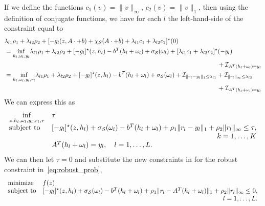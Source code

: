 If we define the functions $c_1(v) = \|v\|_\infty$, $c_2(v) = \|v\|_1$, then using the definition of conjugate functions, we have for each $l$ the left-hand-side of the constraint equal to
\begin{equation*}
\begin{aligned}
		& \lambda_{l1}\rho_1 +  \lambda_{l2}\rho_2 +  [-g_l(z,A\cdot+b) +\chi_\supp(A\cdot+b) + \lambda_{l1} c_1 + \lambda_{l2} c_2]^\star(0)\\
		&= 	\underset{h_l,\omega_l, y_l}{\inf} \lambda_{l1}\rho_1 + \lambda_{l2}\rho_2 + [-g_l]^\star(z,h_l) - b^T(h_l + \omega_l) + \sigma_\supp(\omega_l)  +  [\lambda_{l1} c_1 + \lambda_{l2} c_2 ]^\star(-y_l) \\
  &\hspace{12cm}+ \indicator_{A^T(h_l + \omega_l) = y_l} \\
		&= \underset{h_l,\omega_l, y_l, r_l}{\inf} \lambda_{l1}\rho_1 + \lambda_{l2}\rho_2 + [-g_l]^\star(z,h_l) - b^T(h_l + \omega_l)+ \sigma_\supp(\omega_l)  + \indicator_{\|r_l-y_l\|_1 \leq \lambda_{l1}} + \indicator_{\|r_l\|_\infty \leq \lambda_{l2}} \\
  & \hspace{12cm} + \indicator_{A^T(h_l + \omega_l) = y_l}
\end{aligned}
\end{equation*}
We can express this as
\begin{equation*}
	\begin{aligned}
	\begin{array}[t]{ll}
		\underset{z, h_l,\omega_l, y_l, r_l, \tau}{\inf} & \tau \\
		\mbox{subject to} & [-g_l]^\star(z,h_l)  + \sigma_\supp(\omega_l) -  b^T(h_l + \omega_l) + \rho_1\|r_l - y_l\|_1  + \rho_2\|r_l\|_\infty \leq \tau, \\
  &\hfill k =  1, \dots,K \\
	 & A^T(h_l + \omega_l) = y_l,  \quad l =  1, \dots,L.
	\end{array}
	\end{aligned}
	\end{equation*}
 We can then let $\tau = 0$ and substitute the new constraints in for the robust constraint in~\eqref{eq:robust_prob},
\begin{equation*}
	\begin{array}[t]{ll}
		{\text{minimize}} & f(z) \\
		\mbox{subject to} & [-g_l]^\star(z,h_l)  + \sigma_\supp(\omega_l) -  b^T(h_l + \omega_l) + \rho_1\|r_l - A^T(h_l + \omega_l)\|_1  + \rho_2\|r_l\|_\infty \leq 0,\\
  &\hfill l =  1, \dots,L.	\end{array}
	\end{equation*}

